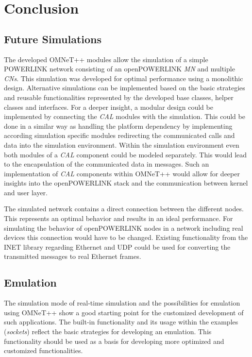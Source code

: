 \chapter{Conclusion}
\label{cha:conclusion}

\section{Future Simulations}
\label{sec:conclusion_futuresim}
\begin{sloppypar}
The developed OMNeT++ modules allow the simulation of a simple \mbox{POWERLINK} network consisting of an openPOWERLINK \emph{MN} and multiple \emph{CNs}.
This simulation was developed for optimal performance using a monolithic design.
Alternative simulations can be implemented based on the basic strategies and reusable functionalities represented by the developed base classes, helper classes and interfaces.
For a deeper insight, a modular design could be implemented by connecting the \emph{CAL} modules with the simulation.
This could be done in a similar way as handling the platform dependency by implementing according simulation specific modules redirecting the communicated calls and data into the simulation environment.
Within the simulation environment even both modules of a \emph{CAL} component could be modeled separately.
This would lead to the encapsulation of the communicated data in messages.
Such an implementation of \emph{CAL} components within OMNeT++ would allow for deeper insights into the openPOWERLINK stack and the communication between kernel and user layer.
\end{sloppypar}

The simulated network contains a direct connection between the different nodes.
This represents an optimal behavior and results in an ideal performance.
For simulating the behavior of openPOWERLINK nodes in a network including real devices this connection would have to be changed.
Existing functionality from the INET library regarding Ethernet and UDP could be used for converting the transmitted messages to real Ethernet frames.

\section{Emulation}
\label{sec:conclusion_emulation}
The simulation mode of real-time simulation and the possibilities for emulation using OMNeT++  show a good starting point for the customized development of such applications.
The built-in functionality and its usage within the examples (\emph{sockets}) reflect the basic strategies for developing an emulation.
This functionality should be used as a basis for developing more optimized and customized functionalities.

